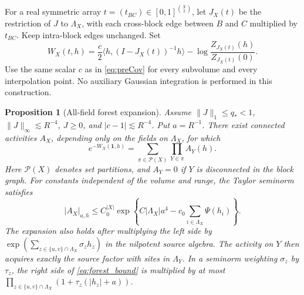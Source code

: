 \documentclass[11pt]{article}
\newtheorem{proposition}{Proposition}[section]
\begin{document}
For a real symmetric array \(t=(t_{BC})\in[0,1]^{\binom X2}\), let
\(J_X(t)\) be the restriction of \(J\) to \(\Lambda_X\), with each
cross-block edge between \(B\) and \(C\) multiplied by \(t_{BC}\).
Keep intra-block edges unchanged. Set
\[
 W_X(t,h)=\frac c2\langle h,(I-J_X(t))^{-1}h\rangle
       -\log\frac{Z_{J_X(t)}(h)}{Z_{J_X(t)}(0)}.
\]
Use the same scalar \(c\) as in \eqref{eq:preCov} for every subvolume
and every interpolation point. No auxiliary Gaussian integration
is performed in this construction.

\begin{proposition}[All-field forest expansion]\label{prop:forest}
Assume \(\|J\|_1\le q_*<1\), \(\|J\|_\infty\lesssim R^{-4}\),
\(J\ge0\), and \(|c-1|\lesssim R^{-4}\). Put \(a=R^{-1}\).
There exist connected activities \(A_X\), depending only on the
fields on \(\Lambda_X\), for which
\begin{equation}\label{eq:forest_partition}
 e^{-W_X(\boldsymbol 1,h)}=
       \sum_{\pi\in\mathcal P(X)}\prod_{Y\in\pi} A_Y(h).
\end{equation}
Here \(\mathcal P(X)\) denotes set partitions, and \(A_Y=0\) if
\(Y\) is disconnected in the block graph. For constants independent
of the volume and range, the Taylor seminorm satisfies
\begin{equation}\label{eq:forest_bound}
 |A_X|_{a,h}\le C_0^{|X|}
 \exp\!\left\{C|\Lambda_X|a^4-c_0\sum_{i\in\Lambda_X}\Psi(h_i)\right\}.
\end{equation}
The expansion also holds after multiplying the left side by
\(\exp(\sum_{z\in\{u,v\}\cap\Lambda_X}\sigma_z h_z)\) in the
nilpotent source algebra. The activity on \(Y\) then acquires exactly
the source factor with sites in \(\Lambda_Y\). In a seminorm weighting
\(\sigma_z\) by \(\tau_z\), the right side of \eqref{eq:forest_bound}
is multiplied by at most
\(\prod_{z\in\{u,v\}\cap\Lambda_X}(1+\tau_z(|h_z|+a))\).
\end{proposition}
\end{document}
